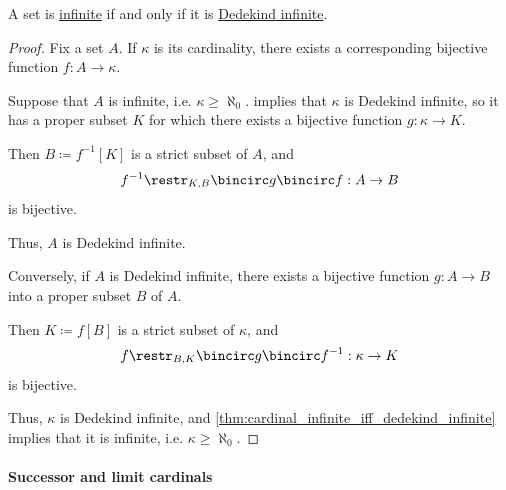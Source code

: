 \begin{proposition}\label{thm:infinite_iff_dedekind_infinite}
  A set is \hyperref[def:aleph_zero_related_cardinalities]{infinite} if and only if it is \hyperref[def:dedekind_finiteness]{Dedekind infinite}.
\end{proposition}
\begin{proof}
  Fix a set \( A \). If \( \kappa \) is its cardinality, there exists a corresponding bijective function \( f: A \to \kappa \).

  \SufficiencySubProof Suppose that \( A \) is infinite, i.e. \( \kappa \geq \aleph_0 \).  implies that \( \kappa \) is Dedekind infinite, so it has a proper subset \( K \) for which there exists a bijective function \( g: \kappa \to K \).

  Then \( B \coloneqq f^{-1}[K] \) is a strict subset of \( A \), and
  \begin{equation*}
    f^{-1}\restr_{K,B} \bincirc g \bincirc f: A \to B
  \end{equation*}
  is bijective.

  Thus, \( A \) is Dedekind infinite.

  \NecessitySubProof Conversely, if \( A \) is Dedekind infinite, there exists a bijective function \( g: A \to B \) into a proper subset \( B \) of \( A \).

  Then \( K \coloneqq f[B] \) is a strict subset of \( \kappa \), and
  \begin{equation*}
    f\restr_{B,K} \bincirc g \bincirc f^{-1}: \kappa \to K
  \end{equation*}
  is bijective.

  Thus, \( \kappa \) is Dedekind infinite, and \cref{thm:cardinal_infinite_iff_dedekind_infinite} implies that it is infinite, i.e. \( \kappa \geq \aleph_0 \).
\end{proof}

\paragraph{Successor and limit cardinals}


